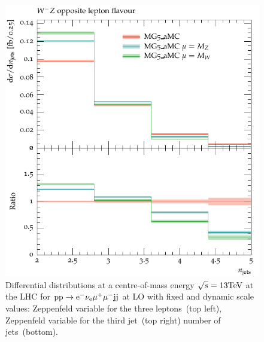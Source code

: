 \begin{figure}[htbp]
\begin{center}
   \includegraphics[scale=0.65]{figs/MG_WmZ_OF_nJets}
\caption{Differential distributions at a centre-of-mass energy $\sqrt{s}=13{\rm TeV}$ at the LHC for ${\rm p} {\rm p}
  \to {\rm e}^-  \nu_{\rm e}  \mu^+ \mu^- {\rm j} {\rm j}$ at LO with fixed and dynamic scale values:  
                Zeppenfeld variable for the three leptons~(top left),
                Zeppenfeld variable for the third jet~(top right)
                number of jets~(bottom).}
\label{vbs_fig_shower_2b}
\end{center}
\end{figure}

